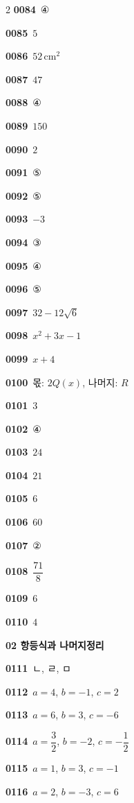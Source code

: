 \documentclass[10pt,a4paper]{article}
\begin{document}
\begin{multicols}{2}
\noindent\textbf{0084}\ ④\par
\noindent\textbf{0085}\ $5$\par
\noindent\textbf{0086}\ $52\,\mathrm{cm}^2$\par
\noindent\textbf{0087}\ $47$\par
\noindent\textbf{0088}\ ④\par
\noindent\textbf{0089}\ $150$\par
\noindent\textbf{0090}\ $2$\par
\noindent\textbf{0091}\ ⑤\par
\noindent\textbf{0092}\ ⑤\par
\noindent\textbf{0093}\ $-3$\par
\noindent\textbf{0094}\ ③\par
\noindent\textbf{0095}\ ④\par
\noindent\textbf{0096}\ ⑤\par
\noindent\textbf{0097}\ $32-12\sqrt{6}$\par
\noindent\textbf{0098}\ $x^2+3x-1$\par
\noindent\textbf{0099}\ $x+4$\par
\noindent\textbf{0100}\ 몫: $2Q(x)$, 나머지: $R$\par
\noindent\textbf{0101}\ $3$\par
\noindent\textbf{0102}\ ④\par
\noindent\textbf{0103}\ $24$\par
\noindent\textbf{0104}\ $21$\par
\noindent\textbf{0105}\ $6$\par
\noindent\textbf{0106}\ $60$\par
\noindent\textbf{0107}\ ②\par
\noindent\textbf{0108}\ $\dfrac{71}{8}$\par
\noindent\textbf{0109}\ $6$\par
\noindent\textbf{0110}\ $4$\par
\noindent\textbf{02 항등식과 나머지정리}\par\smallskip
\noindent\textbf{0111}\ ㄴ, ㄹ, ㅁ\par
\noindent\textbf{0112}\ $a=4$, $b=-1$, $c=2$\par
\noindent\textbf{0113}\ $a=6$, $b=3$, $c=-6$\par
\noindent\textbf{0114}\ $a=\dfrac{3}{2}$, $b=-2$, $c=-\dfrac{1}{2}$\par
\noindent\textbf{0115}\ $a=1$, $b=3$, $c=-1$\par
\noindent\textbf{0116}\ $a=2$, $b=-3$, $c=6$\par

\end{multicols}
\end{document}
